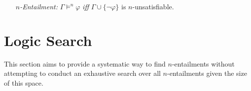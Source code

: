 \documentclass[a4paper, 11pt]{article} %
\newcommand{\set}[1]{\lbrace#1\rbrace} %
\begin{document}
\begin{enumerate}
  \item[\it $n$-Entailment:] $\Gamma \vDash^n \varphi$ \textit{iff} $\Gamma\cup\set{\neg\varphi}$ is $n$-unsatisfiable. 
\end{enumerate}





\section{Logic Search}

This section aims to provide a systematic way to find $n$-entailments without attempting to conduct an exhaustive search over all $n$-entailments given the size of this space.



\end{document}
